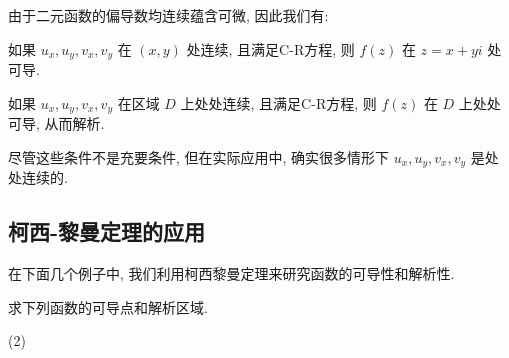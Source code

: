 由于二元函数的偏导数均连续蕴含可微, 因此我们有:
\begin{theorem}
  \begin{enumpar}
    \item 如果 $u_x,u_y,v_x,v_y$ 在 $(x,y)$ 处连续, 且满足C-R方程, 则 $f(z)$ 在 $z=x+yi$ 处可导.
    \item 如果 $u_x,u_y,v_x,v_y$ 在区域 $D$ 上处处连续, 且满足C-R方程, 则 $f(z)$ 在 $D$ 上处处可导, 从而解析.
  \end{enumpar}
\end{theorem}
尽管这些条件不是充要条件, 但在实际应用中, 确实很多情形下 $u_x,u_y,v_x,v_y$ 是处处连续的.


\subsection{柯西-黎曼定理的应用}

在下面几个例子中, 我们利用柯西黎曼定理来研究函数的可导性和解析性.
\begin{example}
  求下列函数的可导点和解析区域.
  \begin{tasksexam}(2)
    \label{enum:exp}
  \end{tasksexam}
\end{example}


